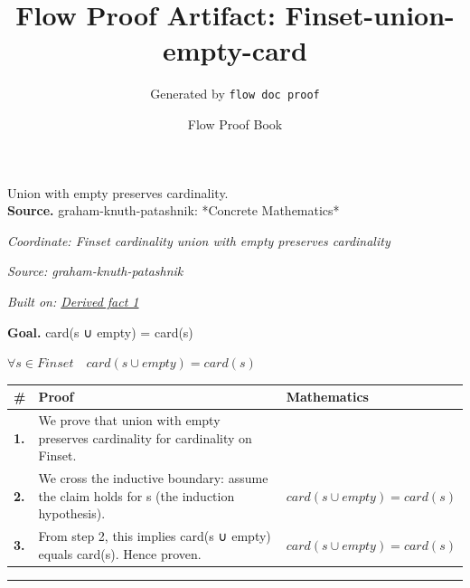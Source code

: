 \documentclass[11pt]{article}
\title{Flow Proof Artifact: Finset-union-empty-card}
\author{Generated by \texttt{flow doc proof}}
\date{Flow Proof Book}
\theoremstyle{definition}
\begin{document}
\maketitle
Union with empty preserves cardinality.\\[0.5em]
\textbf{Source.} graham-knuth-patashnik: *Concrete Mathematics*\\[0.5em]
\bigskip
{}\par
\smallskip\noindent\textit{Coordinate: Finset \cdot cardinality \cdot union with empty preserves cardinality}\par
\smallskip\noindent\textit{Source: graham-knuth-patashnik}\par
\smallskip\noindent\textit{Built on: \hyperref[thm:Finset-cardinality-union_with_empty_preserves_cardinality]{Derived fact 1}}\par
\medskip
\noindent\textbf{Goal.} card(s ∪ empty) = card(s)\par
\noindent$\displaystyle \forall s \in Finset\quad card(s ∪ empty) = card(s)$\par
\medskip
\noindent
\begin{tabular}{@{} >{\raggedright\arraybackslash}p{} >{\raggedright\arraybackslash}p{} >{\raggedleft\arraybackslash}p{} @{}}
\textbf{\#} & \textbf{Proof} & \textbf{Mathematics} \\
\midrule
\textbf{1.} & We prove that union with empty preserves cardinality for cardinality on Finset. & \\[0.45em]
\textbf{2.} & We cross the inductive boundary: assume the claim holds for s (the induction hypothesis). & $\displaystyle card(s ∪ empty) = card(s)$ \\[0.45em]
\textbf{3.} & From step 2, this implies card(s ∪ empty) equals card(s). Hence proven. & $\displaystyle card(s ∪ empty) = card(s)$ \\[0.45em]
\bottomrule
\end{tabular}
\label{thm:Finset-cardinality-union_with_empty_preserves_cardinality}
\par\medskip\hrule
\end{document}
